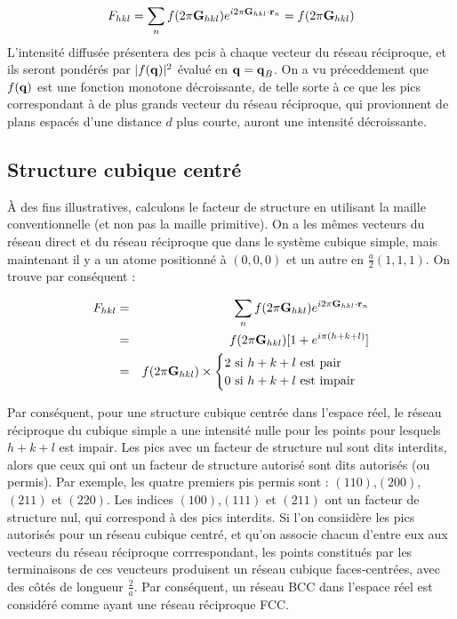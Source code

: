\begin{equation}
    F_{hkl} = \sum_n f(2\pi \mathbf{G}_{hkl}) e^{i 2\pi \mathbf{G}_{hkl}\cdot\mathbf{r}_n } = f(2\pi\mathbf{G}_{hkl})
\end{equation}
L'intensité diffusée présentera des pcis à chaque vecteur du réseau réciproque,
et ils seront pondérés par $|f(\mathbf{q})|^2$ évalué en $\mathbf{q = q}_B$. On a
vu préceddement que $f(\mathbf{q})$ est une fonction monotone décroissante,
de telle sorte à ce que les pics correspondant à de plus grands vecteur du
réseau réciproque, qui provionnent de plans espacés d'une distance $d$ plus
courte, auront une intensité décroissante.
\subsection{Structure cubique centré}

À des fins illustratives, calculons le facteur de structure en utilisant la
maille conventionnelle (et non pas la maille primitive). On a les mêmes vecteurs
du réseau direct et du réseau réciproque que dans le système cubique simple, mais
maintenant il y a un atome positionné à $(0,0,0)$ et un autre en
$\frac{a}{2}(1,1,1)$. On trouve par conséquent :

\begin{eqnarray}
    F_{hkl} & = & \sum_n f(2\pi\mathbf{G}_{hkl}) e^{i 2\pi \mathbf{G}_{hkl}\cdot\mathbf{r}_n} \\
    & = & f(2\pi \mathbf{G}_{hkl}) [1 + e^{i\pi(h+k+l)}] \\
    & = & f(2\pi \mathbf{G}_{hkl}) \times \begin{cases} 2 \text{ si } h+k+l \text{ est pair}\\ 0 \text{ si } h+k+l \text{ est impair}\end{cases}
\end{eqnarray}

Par conséquent, pour une structure cubique centrée dans l'espace réel, le réseau
réciproque du cubique simple a une intensité nulle pour les points pour lesquels
$h + k + l$ est impair. Les pics avec un facteur de structure nul sont dits
interdits, alors que ceux qui ont un facteur de structure autorisé sont dits
autorisés (ou permis). Par exemple, les quatre premiers pis permis sont :
$(110)$,$(200)$,$(211)$ et $(220)$. Les indices $(100)$,$(111)$ et $(211)$ ont un
facteur de structure nul, qui correspond à des pics interdits. Si l'on consiidère
les pics autorisés pour un réseau cubique centré, et qu'on associe chacun d'entre
eux aux vecteurs du réseau réciproque corrrespondant, les points constitués par
les terminaisons de ces veucteurs produisent un réseau cubique faces-centrées,
avec des côtés de longueur $\frac{2}{a}$. Par conséquent, un réseau BCC dans
l'espace réel est considéré comme ayant une réseau réciproque FCC.

